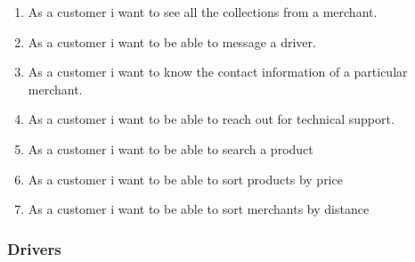 \begin{enumerate}[resume, label=USR-\arabic*]
    \item As a customer i want to see all the collections from a merchant.
    \item As a customer i want to be able to message a driver.
    \item As a customer i want to know the contact information of a 
    particular merchant.
    \item As a customer i want to be able to reach out for technical support.
    \item As a customer i want to be able to search a product 
    \item As a customer i want to be able to sort products by price 
    \item As a customer i want to be able to sort merchants by distance 
\end{enumerate}
\pagebreak
\subsubsection{Drivers}
